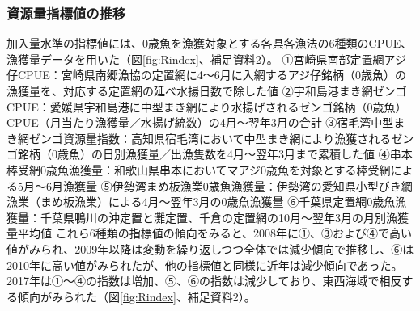 \subsubsection{資源量指標値の推移}
加入量水準の指標値には、0歳魚を漁獲対象とする各県各漁法の6種類のCPUE、漁獲量データを用いた（図\ref{fig:Rindex}、{補足資料2}）。
①宮崎県南部定置網アジ仔CPUE：宮崎県南郷漁協の定置網に4～6月に入網するアジ仔銘柄（0歳魚）の漁獲量を、対応する定置網の延べ水揚日数で除した値
②宇和島港まき網ゼンゴCPUE：愛媛県宇和島港に中型まき網により水揚げされるゼンゴ銘柄（0歳魚）CPUE（月当たり漁獲量／水揚げ統数）の4月～翌年3月の合計
③宿毛湾中型まき網ゼンゴ資源量指数：高知県宿毛湾において中型まき網により漁獲されるゼンゴ銘柄（0歳魚）の日別漁獲量／出漁隻数を4月～翌年3月まで累積した値
④串本棒受網0歳魚漁獲量：和歌山県串本においてマアジ0歳魚を対象とする棒受網による5月～6月漁獲量
⑤伊勢湾まめ板漁業0歳魚漁獲量：伊勢湾の愛知県小型びき網漁業（まめ板漁業）による4月～翌年3月の0歳魚漁獲量
⑥千葉県定置網0歳魚漁獲量：千葉県鴨川の沖定置と灘定置、千倉の定置網の10月～翌年3月の月別漁獲量平均値
これら6種類の指標値の傾向をみると、2008年に①、③および④で高い値がみられ、2009年以降は変動を繰り返しつつ全体では減少傾向で推移し、⑥は2010年に高い値がみられたが、他の指標値と同様に近年は減少傾向であった。
2017年は①～④の指数は増加、⑤、⑥の指数は減少しており、東西海域で相反する傾向がみられた（図\ref{fig:Rindex}、{補足資料2}）。